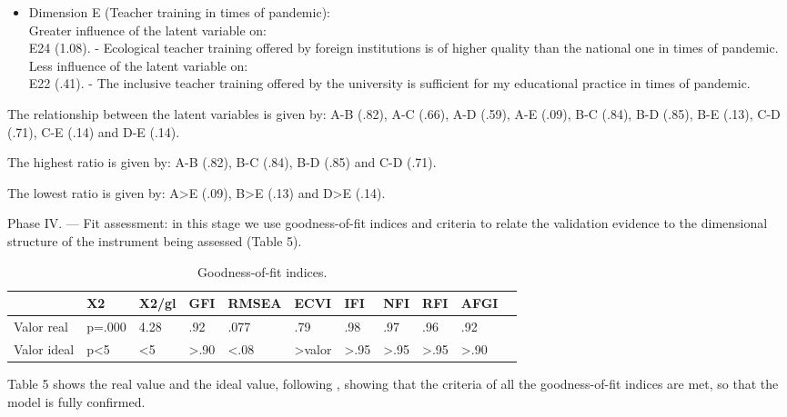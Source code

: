\documentclass{textolivre}
\begin{document}
\begin{itemize}
    \item Dimension E (Teacher training in times of pandemic):
    \\ Greater influence of the latent variable on:
    \\ E24 (1.08). - Ecological teacher training offered by foreign institutions is of higher quality than the national one in times of pandemic.
    \\ Less influence of the latent variable on:
    \\ E22 (.41). - The inclusive teacher training offered by the university is sufficient for my educational practice in times of pandemic.
\end{itemize}

The relationship between the latent variables is given by: A-B (.82), A-C (.66), A-D (.59), A-E (.09), B-C (.84), B-D (.85), B-E (.13), C-D (.71), C-E (.14) and D-E (.14).

The highest ratio is given by: A-B (.82), B-C (.84), B-D (.85) and C-D (.71).

The lowest ratio is given by: A>E (.09), B>E (.13) and D>E (.14).

Phase IV. — Fit assessment: in this stage we use goodness-of-fit indices and criteria to relate the validation evidence to the dimensional structure of the instrument being assessed (Table 5).

\begin{table}[htpb]
\caption{Goodness-of-fit indices.}
\label{tab5}
\centering
\begin{tabular}{p{}llllllllll}
\toprule 
& X2 & X2/gl & GFI & RMSEA & ECVI & IFI	& NFI & RFI & AFGI
\\
\midrule
Valor real & p=.000	& 4.28 & .92 & .077 & .79 & .98 & .97 & .96 & .92
\\
Valor ideal & p<5 & <5 & >.90 & <.08 & >valor	& >.95 & >.95 & >.95 & >.90
\\
\bottomrule
\end{tabular}
\centering
\end{table}

Table 5 shows the real value and the ideal value, following \textcite{levy2006}, %
showing that the criteria of all the goodness-of-fit indices are met, so that the model is fully confirmed.
\end{document}
